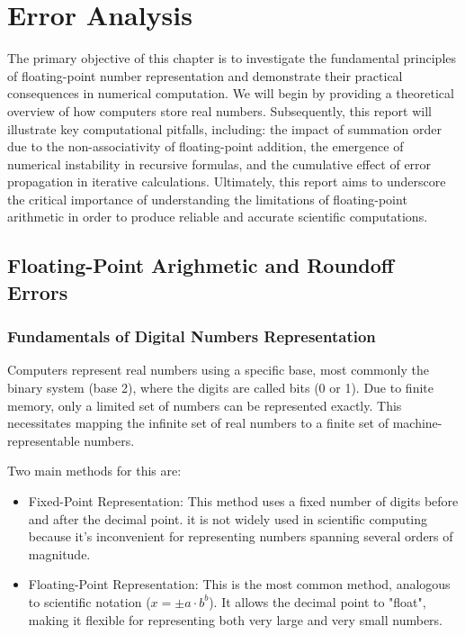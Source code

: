 





\chapter{Error Analysis}
The primary objective of this chapter is to investigate the fundamental principles of floating-point number representation and demonstrate their practical consequences in numerical computation. We will begin by providing a theoretical overview of how computers store real numbers. Subsequently, this report will illustrate key computational pitfalls, including: the impact of summation order due to the non-associativity of floating-point addition, the emergence of numerical instability in recursive formulas, and the cumulative effect of error propagation in iterative calculations. Ultimately, this report aims to underscore the critical importance of understanding the limitations of floating-point arithmetic in order to produce reliable and accurate scientific computations.

\section{Floating-Point Arighmetic and Roundoff Errors}

\subsection{Fundamentals of Digital Numbers Representation}
Computers represent real numbers using a specific base, most commonly the binary system (base 2), where the digits are called bits (0 or 1). Due to finite memory, only a limited set of numbers can be represented exactly. This necessitates mapping the infinite set of real numbers to a finite set of machine-representable numbers.

Two main methods for this are:

\begin{itemize}
    \item Fixed-Point Representation: This method uses a fixed number of digits before and after the decimal point. it is not widely used in scientific computing because it's inconvenient for representing numbers spanning several orders of magnitude.
    \item Floating-Point Representation: This is the most common method, analogous to scientific notation ($x = \pm a \cdot b^{b}$). It allows the decimal point to "float", making it flexible for representing both very large and very small numbers.
\end{itemize}

